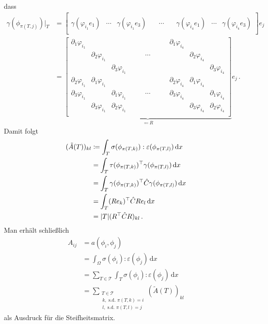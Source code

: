 \documentclass{scrartcl}
\def\e{\varepsilon}
\def\ev{e}
\newcommand{\cT}{\mathcal{T}}
\newcommand{\hC}{\hat{C}}
\newcommand{\tiA}{\tilde{A}}
\newcommand{\dif}[1]{\,\mathrm{d} #1}
\DeclarePairedDelimiter{\abs}{\lvert}{\rvert}
\newcommand{\vect}[1]{\begin{bmatrix} #1 \end{bmatrix}}
\begin{document}
dass
\begin{align*}
	\gamma\left(\phi_{\pi(T,j)}\right)\bigg\vert_T 
	&= \begin{bmatrix}
		& & & & & &\\
		\gamma(\varphi_{i_1}e_1) & \cdots & \gamma(\varphi_{i_1}e_3)
		& \quad\cdots\quad
		& \gamma(\varphi_{i_4}e_1) & \cdots & \gamma(\varphi_{i_4}e_3) \\
		& & & & & &
	\end{bmatrix}e_j	 \\	
	&= \underbrace{\begin{bmatrix}
		\partial_1\varphi_{i_1} & & &     &\partial_1\varphi_{i_4} & & \\
		& \partial_2\varphi_{i_1} & &  \qquad\cdots\qquad   & &\partial_2\varphi_{i_4} & \\
		& & \partial_3\varphi_{i_1} &     & & &\partial_3\varphi_{i_4} \\
		\partial_2\varphi_{i_1} & \partial_1\varphi_{i_1} & &
		& \partial_2\varphi_{i_4} &\partial_1\varphi_{i_4} &  \\
		\partial_3\varphi_{i_1} & & \partial_1\varphi_{i_1} & \qquad\cdots\qquad 
		& \partial_3\varphi_{i_4} & &\partial_1\varphi_{i_4}  \\
		& \partial_3\varphi_{i_1} & \partial_2\varphi_{i_1} &
		& & \partial_3\varphi_{i_4} &\partial_2\varphi_{i_4}  \\
	\end{bmatrix}}_{\eqqcolon R}
	\ev_j\,.
\end{align*}
Damit folgt
\begin{align*}
	(\tiA(T))_{kl}
	&\coloneqq \int_T\sigma(\phi_{\pi(T,k)}):\e(\phi_{\pi(T,l)})\dif x \\
	&= \int_T\tau(\phi_{\pi(T,k)})^\top\gamma(\phi_{\pi(T,l)})\dif x \\
	&= \int_T\gamma(\phi_{\pi(T,k)})^\top \hC\gamma(\phi_{\pi(T,l)})\dif x \\
	&= \int_T (R\ev_k)^\top \hC R\ev_l\dif x \\
	&= \abs{T}(R^\top \hC R)_{kl}\,.
\end{align*}
Man erhält schließlich
\begin{align*}
	A_{ij}
	&=a(\phi_i,\phi_j) \\
	&= \int_\Omega\sigma(\phi_i):\e(\phi_j)\dif x \\
	&= \sum_{T\in\cT}\int_T\sigma(\phi_i):\e(\phi_j)\dif x \\
	&= \sum_{\substack{T\in\cT \\ \,k,\text{ s.d. }\pi(T,k)=i \\ \,l,\text{ s.d. }\pi(T,l)=j}}(\tiA(T))_{kl}
\end{align*}
als Ausdruck für die Steifheitsmatrix.
\end{document}
